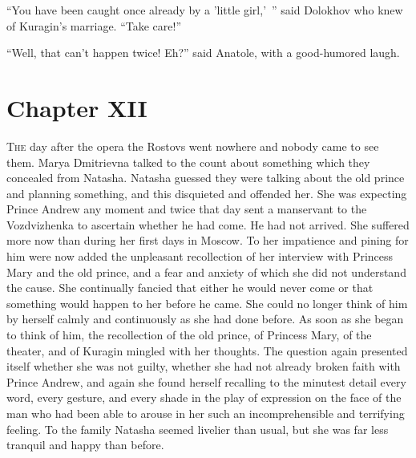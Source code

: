 ``You have been caught once already by a 'little girl,'\ '' said
Dolokhov who knew of Kuragin's marriage. ``Take care!''

``Well, that can't happen twice! Eh?'' said Anatole, with a
good-humored laugh.


\chapter*{Chapter XII}
\ifaudio     
{} 
\fi

\lettrine[lines=2, loversize=0.3, lraise=0]{\initfamily T}{he}
day after the opera the Rostovs went nowhere and nobody came
to see them. Marya Dmitrievna talked to the count about something
which they concealed from Natasha. Natasha guessed they were
talking about the old prince and planning something, and this
disquieted and offended her. She was expecting Prince Andrew any
moment and twice that day sent a manservant to the Vozdvizhenka
to ascertain whether he had come. He had not arrived. She
suffered more now than during her first days in Moscow.  To her
impatience and pining for him were now added the unpleasant
recollection of her interview with Princess Mary and the old
prince, and a fear and anxiety of which she did not understand
the cause. She continually fancied that either he would never
come or that something would happen to her before he came. She
could no longer think of him by herself calmly and continuously
as she had done before. As soon as she began to think of him, the
recollection of the old prince, of Princess Mary, of the theater,
and of Kuragin mingled with her thoughts. The question again
presented itself whether she was not guilty, whether she had not
already broken faith with Prince Andrew, and again she found
herself recalling to the minutest detail every word, every
gesture, and every shade in the play of expression on the face of
the man who had been able to arouse in her such an
incomprehensible and terrifying feeling. To the family Natasha
seemed livelier than usual, but she was far less tranquil and
happy than before.

